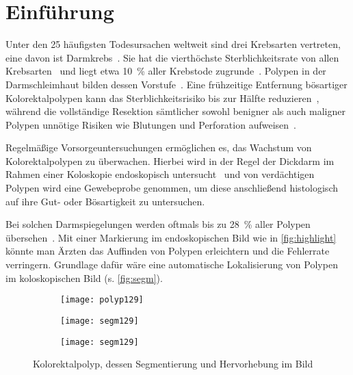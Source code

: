 \chapter{Einführung}

Unter den 25 häufigsten Todesursachen weltweit sind drei Krebsarten vertreten, eine davon ist Darmkrebs~\cite{Lozano.2012}.
Sie hat die vierthöchste Sterblichkeitsrate von allen Krebsarten~\cite{Ferlay.2012} und liegt etwa 10~\% aller Krebstode zugrunde~\cite{Kumar.2005}.
Polypen in der Darmschleimhaut bilden dessen Vorstufe~\cite{Kumar.2005}.
Eine frühzeitige Entfernung bösartiger Kolorektalpolypen kann das Sterblichkeitsrisiko bis zur Hälfte reduzieren~\cite{Zauber.2012}, während die vollständige Resektion sämtlicher sowohl benigner als auch maligner Polypen unnötige Risiken wie Blutungen und Perforation aufweisen~\cite{Rex.2009}.

Regelmäßige Vorsorgeuntersuchungen ermöglichen es, das Wachstum von Kolorektalpolypen zu überwachen.
Hierbei wird in der Regel der Dickdarm im Rahmen einer Koloskopie endoskopisch untersucht~\cite{Kumar.2005} und von verdächtigen Polypen wird eine Gewebeprobe genommen, um diese anschließend histologisch auf ihre Gut- oder Bösartigkeit zu untersuchen.

Bei solchen Darmspiegelungen werden oftmals bis zu 28~\% aller Polypen übersehen~\cite{Leufkens.2012}.
Mit einer Markierung im endoskopischen Bild wie in \autoref{fig:highlight} könnte man Ärzten das Auffinden von Polypen erleichtern und die Fehlerrate verringern.
Grundlage dafür wäre eine automatische Lokalisierung von Polypen im koloskopischen Bild (s. \autoref{fig:segm}).

\begin{figure}
	\centering
	\begin{subfigure}{.3\textwidth}
		\centering
		\texttt{[image: polyp129]}
		\caption{}
		\label{fig:polyp}
	\end{subfigure}
	\begin{subfigure}{.3\textwidth}
		\centering
		\texttt{[image: segm129]}
		\caption{}
		\label{fig:segm}
	\end{subfigure}
	\begin{subfigure}{.3\textwidth}
		\centering
		\texttt{[image: segm129]}
		\caption{}
		\label{fig:highlight}
	\end{subfigure}
	\caption{Kolorektalpolyp, dessen Segmentierung und Hervorhebung im Bild~\cite{Vazquez.2017}}
	\label{fig:polypseg}
\end{figure}

